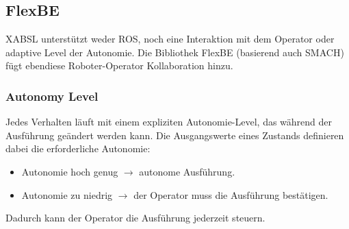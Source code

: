		\subsection{FlexBE}
			XABSL unterstützt weder ROS, noch eine Interaktion mit dem Operator oder adaptive Level der Autonomie. Die Bibliothek FlexBE (basierend auch SMACH) fügt ebendiese Roboter-Operator Kollaboration hinzu.

			\subsubsection{Autonomy Level}
				Jedes Verhalten läuft mit einem expliziten Autonomie-Level, das während der Ausführung geändert werden kann. Die Ausgangswerte eines Zustands definieren dabei die erforderliche Autonomie:
				\begin{itemize}
					\item Autonomie hoch genug \(\to\) autonome Ausführung.
					\item Autonomie zu niedrig \(\to\) der Operator muss die Ausführung bestätigen.
				\end{itemize}
				Dadurch kann der Operator die Ausführung jederzeit steuern.
